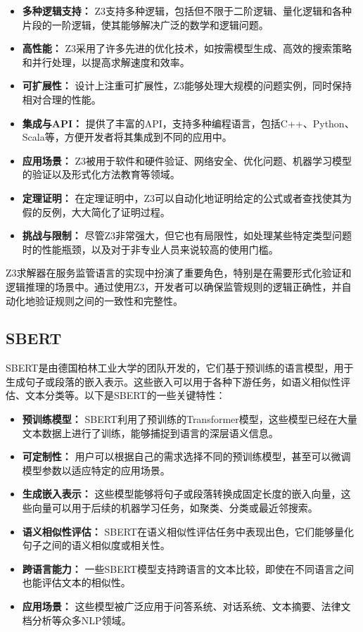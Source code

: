 \begin{itemize}
    \item \textbf{多种逻辑支持：} Z3支持多种逻辑，包括但不限于二阶逻辑、量化逻辑和各种片段的一阶逻辑，使其能够解决广泛的数学和逻辑问题。
    \item \textbf{高性能：} Z3采用了许多先进的优化技术，如按需模型生成、高效的搜索策略和并行处理，以提高求解速度和效率。
    \item \textbf{可扩展性：} 设计上注重可扩展性，Z3能够处理大规模的问题实例，同时保持相对合理的性能。
    \item \textbf{集成与API：} 提供了丰富的API，支持多种编程语言，包括C++、Python、Scala等，方便开发者将其集成到不同的应用中。
    \item \textbf{应用场景：} Z3被用于软件和硬件验证、网络安全、优化问题、机器学习模型的验证以及形式化方法教育等领域。
    \item \textbf{定理证明：} 在定理证明中，Z3可以自动化地证明给定的公式或者查找使其为假的反例，大大简化了证明过程。
    \item \textbf{挑战与限制：} 尽管Z3非常强大，但它也有局限性，如处理某些特定类型问题时的性能瓶颈，以及对于非专业人员来说较高的使用门槛。
\end{itemize}

Z3求解器在服务监管语言的实现中扮演了重要角色，特别是在需要形式化验证和逻辑推理的场景中。通过使用Z3，开发者可以确保监管规则的逻辑正确性，并自动化地验证规则之间的一致性和完整性。

\subsection{SBERT}
SBERT是由德国柏林工业大学的团队开发的，它们基于预训练的语言模型，用于生成句子或段落的嵌入表示。这些嵌入可以用于各种下游任务，如语义相似性评估、文本分类等。以下是SBERT的一些关键特性：

\begin{itemize}
    \item \textbf{预训练模型：} SBERT利用了预训练的Transformer模型，这些模型已经在大量文本数据上进行了训练，能够捕捉到语言的深层语义信息。
    \item \textbf{可定制性：} 用户可以根据自己的需求选择不同的预训练模型，甚至可以微调模型参数以适应特定的应用场景。
    \item \textbf{生成嵌入表示：} 这些模型能够将句子或段落转换成固定长度的嵌入向量，这些向量可以用于后续的机器学习任务，如聚类、分类或最近邻搜索。
    \item \textbf{语义相似性评估：} SBERT在语义相似性评估任务中表现出色，它们能够量化句子之间的语义相似度或相关性。
    \item \textbf{跨语言能力：} 一些SBERT模型支持跨语言的文本比较，即使在不同语言之间也能评估文本的相似性。
    \item \textbf{应用场景：} 这些模型被广泛应用于问答系统、对话系统、文本摘要、法律文档分析等众多NLP领域。
\end{itemize}

